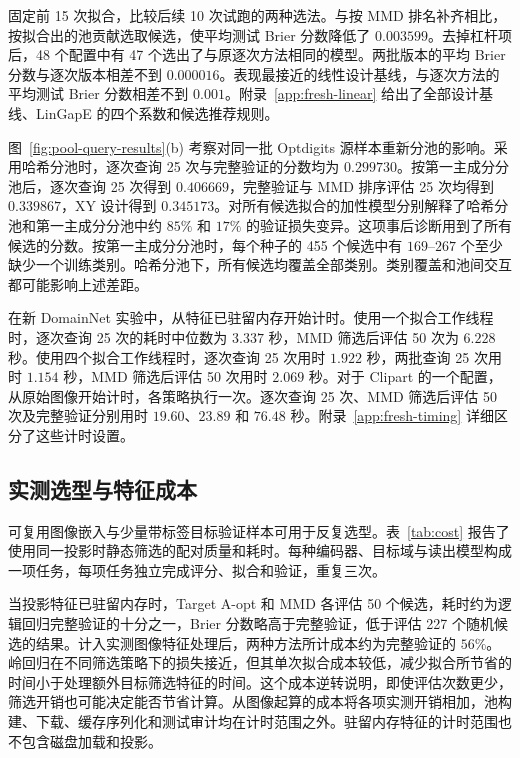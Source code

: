 \documentclass[UTF8,fontset=fandol,scheme=chinese,zihao=false,11pt,letterpaper]{ctexart}
\begin{document}
固定前 15 次拟合，比较后续 10 次试跑的两种选法。与按 MMD 排名补齐相比，按拟合出的池贡献选取候选，使平均测试 Brier 分数降低了 $0.003599$。去掉杠杆项后，48 个配置中有 47 个选出了与原逐次方法相同的模型。两批版本的平均 Brier 分数与逐次版本相差不到 $0.000016$。表现最接近的线性设计基线，与逐次方法的平均测试 Brier 分数相差不到 $0.001$。附录~\ref{app:fresh-linear} 给出了全部设计基线、LinGapE 的四个系数和候选推荐规则。

图~\ref{fig:pool-query-results}(b) 考察对同一批 Optdigits 源样本重新分池的影响。采用哈希分池时，逐次查询 25 次与完整验证的分数均为 $0.299730$。按第一主成分分池后，逐次查询 25 次得到 $0.406669$，完整验证与 MMD 排序评估 25 次均得到 $0.339867$，XY 设计得到 $0.345173$。对所有候选拟合的加性模型分别解释了哈希分池和第一主成分分池中约 $85\%$ 和 $17\%$ 的验证损失变异。这项事后诊断用到了所有候选的分数。按第一主成分分池时，每个种子的 455 个候选中有 $169$--$267$ 个至少缺少一个训练类别。哈希分池下，所有候选均覆盖全部类别。类别覆盖和池间交互都可能影响上述差距。

在新 DomainNet 实验中，从特征已驻留内存开始计时。使用一个拟合工作线程时，逐次查询 25 次的耗时中位数为 $3.337$ 秒，MMD 筛选后评估 50 次为 $6.228$ 秒。使用四个拟合工作线程时，逐次查询 25 次用时 $1.922$ 秒，两批查询 25 次用时 $1.154$ 秒，MMD 筛选后评估 50 次用时 $2.069$ 秒。对于 Clipart 的一个配置，从原始图像开始计时，各策略执行一次。逐次查询 25 次、MMD 筛选后评估 50 次及完整验证分别用时 $19.60$、$23.89$ 和 $76.48$ 秒。附录~\ref{app:fresh-timing} 详细区分了这些计时设置。

\subsection{实测选型与特征成本}
\label{sec:cost}
可复用图像嵌入与少量带标签目标验证样本可用于反复选型。表~\ref{tab:cost} 报告了使用同一投影时静态筛选的配对质量和耗时。每种编码器、目标域与读出模型构成一项任务，每项任务独立完成评分、拟合和验证，重复三次。

当投影特征已驻留内存时，Target A-opt 和 MMD 各评估 50 个候选，耗时约为逻辑回归完整验证的十分之一，Brier 分数略高于完整验证，低于评估 227 个随机候选的结果。计入实测图像特征处理后，两种方法所计成本约为完整验证的 $56\%$。岭回归在不同筛选策略下的损失接近，但其单次拟合成本较低，减少拟合所节省的时间小于处理额外目标筛选特征的时间。这个成本逆转说明，即使评估次数更少，筛选开销也可能决定能否节省计算。从图像起算的成本将各项实测开销相加，池构建、下载、缓存序列化和测试审计均在计时范围之外。驻留内存特征的计时范围也不包含磁盘加载和投影。
\end{document}
